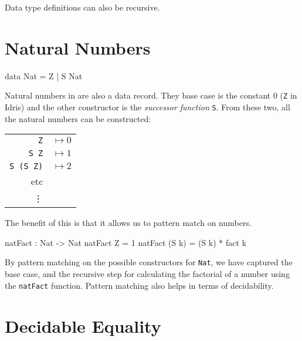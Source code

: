     Data type definitions can also be recursive.


\section{Natural Numbers}\label{des:nats}
    \begin{code}[caption={Natural numbers as defined in the \Idris prelude}]
        data Nat = Z | S Nat
    \end{code}

    Natural numbers in \Idris are also a data record. They base case is the constant 0 (\texttt{Z} in Idris) and the other constructor is the \textit{successor function} \texttt{S}. From these two, all the natural numbers can be constructed:
    
    \begin{tabular}{r l}
        \texttt{Z} & $\mapsto 0$ \\ 
        \texttt{S Z} & $\mapsto 1$ \\ 
        \texttt{S (S Z)} & $\mapsto 2$ \\
        etc & \\
        \vdots & \\
    \end{tabular}
    \par
    The benefit of this is that it allows us to pattern match on numbers.
    
    \begin{code}[caption={Pattern matching on \texttt{Nat}s}]
        natFact : Nat -> Nat
        natFact Z = 1
        natFact (S k) = (S k) * fact k
    \end{code}
    By pattern matching on the possible constructors for \texttt{Nat}, we have captured the base case, and the recursive step for calculating the factorial of a number using the \texttt{natFact} function.
    Pattern matching also helps in terms of decidability.


\section{Decidable Equality}\label{idris:deceq}
